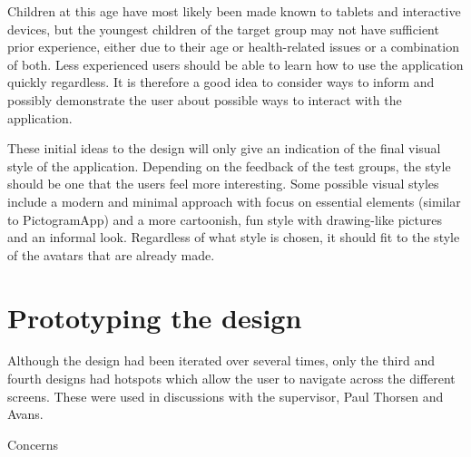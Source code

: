 Children at this age have most likely been made known to tablets and interactive devices, but the youngest children of the target group may not have sufficient prior experience, either due to their age or health-related issues or a combination of both. Less experienced users should be able to learn how to use the application quickly regardless. It is therefore a good idea to consider ways to inform and possibly demonstrate the user about possible ways to interact with the application.

These initial ideas to the design will only give an indication of the final visual style of the application. Depending on the feedback of the test groups, the style should be one that the users feel more interesting. Some possible visual styles include a modern and minimal approach with focus on essential elements (similar to PictogramApp) and a more cartoonish, fun style with drawing-like pictures and an informal look. Regardless of what style is chosen, it should fit to the style of the avatars that are already made.



\section{Prototyping the design}

Although the design had been iterated over several times, only the third and fourth designs had hotspots which allow the user to navigate across the different screens. These were used in discussions with the supervisor, Paul Thorsen and Avans.




Concerns
